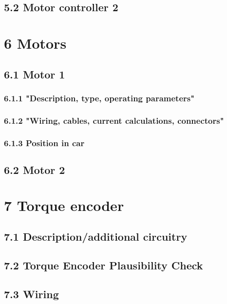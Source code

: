 \documentclass{article}
\begin{document}
\subsection*{5.2 Motor controller 2}

\section*{6 Motors}

\subsection*{6.1 Motor 1}

\subsubsection*{6.1.1 "Description, type, operating parameters"}

\subsubsection*{6.1.2 "Wiring, cables, current calculations, connectors"}

\subsubsection*{6.1.3 Position in car}

\subsection*{6.2 Motor 2}

\section*{7 Torque encoder}

\subsection*{7.1 Description/additional circuitry}

\subsection*{7.2 Torque Encoder Plausibility Check}

\subsection*{7.3 Wiring}
\end{document}
